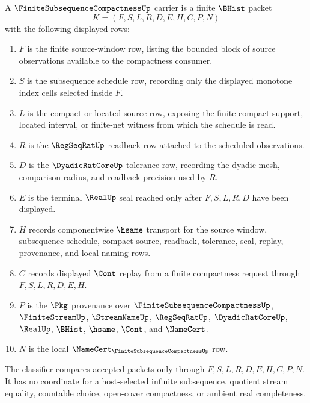 \begin{definition}
\label{def:finite-subsequence-compactness-carrier}
A $\FiniteSubsequenceCompactnessUp$ carrier is a finite $\BHist$ packet
$$
K=(F,S,L,R,D,E,H,C,P,N)
$$
with the following displayed rows:
\begin{enumerate}
\item $F$ is the finite source-window row, listing the bounded block of source observations available to the compactness consumer.
\item $S$ is the subsequence schedule row, recording only the displayed monotone index cells selected inside $F$.
\item $L$ is the compact or located source row, exposing the finite compact support, located interval, or finite-net witness from which the schedule is read.
\item $R$ is the $\RegSeqRatUp$ readback row attached to the scheduled observations.
\item $D$ is the $\DyadicRatCoreUp$ tolerance row, recording the dyadic mesh, comparison radius, and readback precision used by $R$.
\item $E$ is the terminal $\RealUp$ seal reached only after $F,S,L,R,D$ have been displayed.
\item $H$ records componentwise $\hsame$ transport for the source window, subsequence schedule, compact source, readback, tolerance, seal, replay, provenance, and local naming rows.
\item $C$ records displayed $\Cont$ replay from a finite compactness request through $F,S,L,R,D,E,H$.
\item $P$ is the $\Pkg$ provenance over $\FiniteSubsequenceCompactnessUp$, $\FiniteStreamUp$, $\StreamNameUp$, $\RegSeqRatUp$, $\DyadicRatCoreUp$, $\RealUp$, $\BHist$, $\hsame$, $\Cont$, and $\NameCert$.
\item $N$ is the local $\NameCert_{\FiniteSubsequenceCompactnessUp}$ row.
\end{enumerate}
The classifier compares accepted packets only through $F,S,L,R,D,E,H,C,P,N$. It has no coordinate for a host-selected infinite subsequence, quotient stream equality, countable choice, open-cover compactness, or ambient real completeness.
\end{definition}

